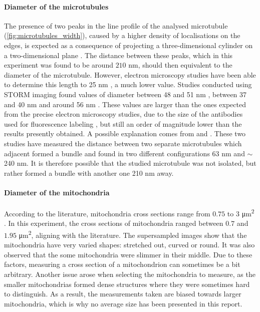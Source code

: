 \paragraph{Diameter of the microtubules}
The presence of two peaks in the line profile of the analysed microtubule (\autoref{fig:microtubules_width}), caused by a higher density of localisations on the edges, is expected as a consequence of projecting a three-dimensional cylinder on a two-dimensional plane \cite{douglass_notice_2023}.
The distance between these peaks, which in this experiment was found to be around $210$ nm, should then equivalent to the diameter of the microtubule.
However, electron microscopy studies have been able to determine this length to 25 nm \cite{moores_electron_2008}, a much lower value.
Studies conducted using STORM imaging found values of diameter between 48 and 51 nm \cite{bharadwaj_advancing_2024}, between 37 and 40 nm \cite{douglass_super-resolution_2016} and around 56 nm \cite{bates_multicolor_2007}.
These values are larger than the ones expected from the precise electron microscopy studies, due to the size of the antibodies used for fluorescence labeling \cite{douglass_notice_2023}, but still an order of magnitude lower than the results presently obtained.
A possible explanation comes from \cite{dong_stochastic_2015} and \cite{wang_blind_2017}.
These two studies have measured the distance between two separate microtubules which adjacent formed a bundle and found in two different configurations 63 nm and $\sim$240 nm.
It is therefore possible that the studied microtubule  was not isolated, but rather formed a bundle with another one 210 nm away.

\paragraph{Diameter of the mitochondria}
According to the literature, mitochondria cross sections range from $0.75$ to $3$ \si{\micro\meter\squared} \cite{wiemerslage_quantification_2016}. In this experiment, the cross sections of mitochondria ranged between $0.7$ and $1.95$ \si{\micro\meter\squared}, aligning with the literature. The supersampled images show that the mitochondria have very varied shapes: stretched out, curved or round. It was also observed that the some mitochondria were slimmer in their middle. Due to these factors, measuring a cross section of a mitochondrion can sometimes be a bit arbitrary.
Another issue arose when selecting the mitochondria to measure, as the smaller mitochondrias formed dense structures where they were sometimes hard to distinguish. As a result, the measurements taken are biased towards larger mitochondria, which is why no average size has been presented in this report.

